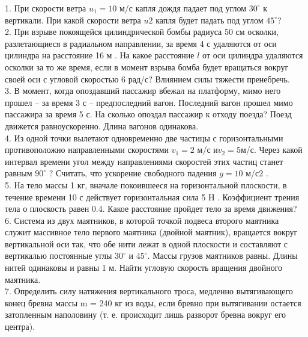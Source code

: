 \documentclass[A4paper]{article}
\begin{document}
    
    1. При скорости ветра $u_1 = 10$ м/с капля дождя падает под углом $30^\circ$ к вертикали. При какой скорости ветра $u 2$ капля будет падать
    под углом $45^\circ$?\\
    
    2. При взрыве покоящейся цилиндрической бомбы радиуса 50 см осколки, разлетающиеся в радиальном направлении, за время 4 с удаляются от оси цилиндра на расстояние 16 м . На какое расстояние $l$ от оси цилиндра удаляются осколки за то же время, если в момент взрыва бомба будет вращаться вокруг своей оси с угловой скоростью 6 рад/с? Влиянием силы тяжести пренебречь.\\
    
    3. В момент, когда опоздавший пассажир вбежал на платформу, мимо него прошел – за время 3 с – предпоследний вагон. Последний вагон прошел мимо пассажира за время 5 с. На сколько опоздал пассажир к отходу поезда? Поезд движется равноускоренно. Длина вагонов одинакова. \\
    
    4. Из одной точки вылетают одновременно две частицы с горизонтальными противоположно направленными
    скоростями $ v_1 = 2 $ м/с и$  v_2 = 5 $м/с. Через какой интервал времени угол между направлениями скоростей этих частиц станет равным $ 90^\circ$ ? Считать, что ускорение свободного падения $ g = 10$  м/с2 .\\
    
    5. На тело массы 1 кг, вначале покоившееся на горизонтальной плоскости, в течение времени 10 с действует горизонтальная сила 5 Н . Коэффициент трения тела о плоскость равен 0.4. Какое расстояние пройдет тело за время движения?\\
    
    6. Система из двух маятников, в которой точкой подвеса второго маятника служит массивное тело первого маятника (двойной маятник), вращается вокруг вертикальной оси так, что обе нити лежат в одной плоскости и составляют с вертикалью постоянные углы $30^\circ$ и $45^\circ$. Массы грузов маятников равны. Длины нитей одинаковы и равны 1 м. Найти угловую скорость вращения двойного маятника.\\
    
    7. Определить силу натяжения вертикального троса, медленно вытягивающего конец бревна массы m = 240 кг из воды, если бревно при вытягивании остается затопленным наполовину (т. е. происходит лишь разворот бревна вокруг его центра).\\
    
\end{document}
